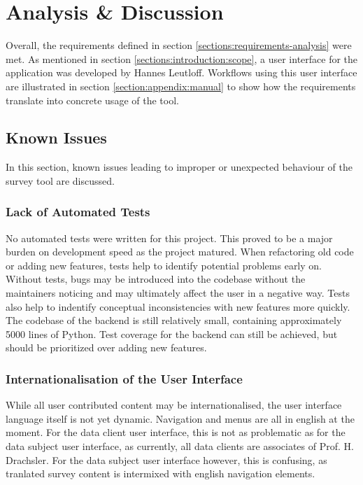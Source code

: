 \section{Analysis \& Discussion}
	Overall, the requirements defined in section \ref{sections:requirements-analysis} were met.
	As mentioned in section \ref{sections:introduction:scope}, a user interface for the
	application was developed by Hannes Leutloff. Workflows using this user interface are
	illustrated in section \ref{section:appendix:manual} to show how the requirements
	translate into concrete usage of the tool.

    \subsection{Known Issues}
    	In this section, known issues leading to improper or unexpected
    	behaviour of the survey tool are discussed.

    	\subsubsection{Lack of Automated Tests}
    		No automated tests were written for this project. This proved
    		to be a major burden on development speed as the project
    		matured. When refactoring old code or adding new features,
    		tests help to identify potential problems early on.
    		Without tests, bugs may be introduced into the codebase
    		without the maintainers noticing and may ultimately
    		affect the user in a negative way. Tests also
    		help to indentify conceptual inconsistencies
    		with new features more quickly. The codebase of the
    		backend is still relatively small, containing
    		approximately 5000 lines of Python. Test coverage for
    		the backend can still be achieved, but should be prioritized
    		over adding new features.

    	\subsubsection{Internationalisation of the User Interface}
    		While all user contributed content may be internationalised,
    		the user interface language itself is not yet dynamic.
    		Navigation and menus are all in english at the moment.
    		For the data client user interface, this is not as
    		problematic as for the data subject user interface, as 
    		currently, all data clients are associates of Prof. H. Drachsler.
    		For the data subject user interface however, this is confusing,
    		as tranlated survey content is intermixed with english
    		navigation elements.

